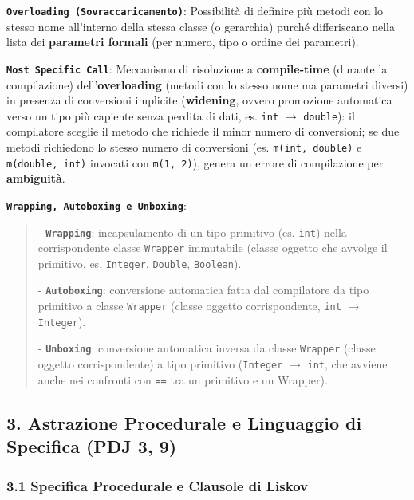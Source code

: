 \textbf{\texttt{Overloading (Sovraccaricamento)}}: Possibilità di definire più metodi con lo stesso nome all'interno della stessa classe (o gerarchia) purché differiscano nella lista dei \textbf{parametri formali} (per numero, tipo o ordine dei parametri).

\textbf{\texttt{Most Specific Call}}: Meccanismo di risoluzione a \textbf{compile-time} (durante la compilazione) dell'\textbf{overloading} (metodi con lo stesso nome ma parametri diversi) in presenza di conversioni implicite (\textbf{widening}, ovvero promozione automatica verso un tipo più capiente senza perdita di dati, es. \texttt{int} $\to$ \texttt{double}): il compilatore sceglie il metodo che richiede il minor numero di conversioni; se due metodi richiedono lo stesso numero di conversioni (es. \texttt{m(int, double)} e \texttt{m(double, int)} invocati con \texttt{m(1, 2)}), genera un errore di compilazione per \textbf{ambiguità}.

\textbf{\texttt{Wrapping, Autoboxing e Unboxing}}:

\begin{quote}\small

- \textbf{\texttt{Wrapping}}: incapsulamento di un tipo primitivo (es. \texttt{int}) nella corrispondente classe \texttt{Wrapper} immutabile (classe oggetto che avvolge il primitivo, es. \texttt{Integer}, \texttt{Double}, \texttt{Boolean}).

- \textbf{\texttt{Autoboxing}}: conversione automatica fatta dal compilatore da tipo primitivo a classe \texttt{Wrapper} (classe oggetto corrispondente, \texttt{int} $\to$ \texttt{Integer}).

- \textbf{\texttt{Unboxing}}: conversione automatica inversa da classe \texttt{Wrapper} (classe oggetto corrispondente) a tipo primitivo (\texttt{Integer} $\to$ \texttt{int}, che avviene anche nei confronti con \texttt{==} tra un primitivo e un Wrapper).

\end{quote}

\subsection{3. Astrazione Procedurale e Linguaggio di Specifica (PDJ 3, 9)}\label{3-astrazione-procedurale-e-linguaggio-di-specifica-pdj-3-9}

\subsubsection{3.1 Specifica Procedurale e Clausole di Liskov}\label{3-1-specifica-procedurale-e-clausole-di-liskov}

